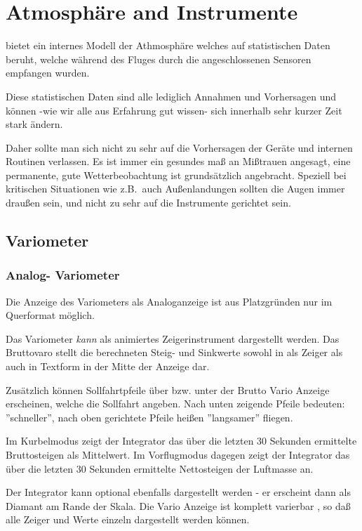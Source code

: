\chapter{Atmosphäre and Instrumente}\label{cha:atmosph}
\xc bietet ein internes Modell der Athmosphäre welches auf statistischen Daten beruht,
welche während des Fluges durch die angeschlossenen Sensoren empfangen wurden.

Diese statistischen Daten sind alle lediglich Annahmen und Vorhersagen und können -wie wir alle
aus Erfahrung gut wissen-  sich innerhalb sehr kurzer Zeit stark ändern.

Daher sollte man sich nicht zu sehr auf die Vorhersagen der Geräte und internen Routinen verlassen.
Es ist immer ein gesundes maß an Mißtrauen angesagt, eine permanente, gute Wetterbeobachtung
ist grundsätzlich angebracht. Speziell bei kritischen Situationen wie z.B.\ auch
Außenlandungen sollten die Augen immer draußen sein, und nicht zu sehr auf die Instrumente
gerichtet sein.
\section{Variometer}
\subsection*{Analog- Variometer}
Die Anzeige des Variometers als Analoganzeige ist aus Platzgründen nur im Querformat möglich.

Das Variometer \textsl{kann} als animiertes Zeigerinstrument dargestellt werden.
Das Bruttovaro stellt die berechneten Steig- und Sinkwerte sowohl in als Zeiger als
auch in Textform in der Mitte der Anzeige dar.

Zusätzlich können Sollfahrtpfeile über bzw. unter der Brutto Vario Anzeige erscheinen,
welche die Sollfahrt angeben. Nach unten zeigende Pfeile bedeuten: ''schneller'', nach oben
gerichtete Pfeile heißen ''langsamer'' fliegen.

Im Kurbelmodus zeigt der Integrator das über die letzten 30 Sekunden ermittelte Bruttosteigen als Mittelwert.
Im Vorflugmodus dagegen zeigt der Integrator das über die letzten 30 Sekunden ermittelte Nettosteigen der Luftmasse an.

Der Integrator kann optional ebenfalls dargestellt werden - er erscheint dann als Diamant am Rande der Skala.
Die Vario Anzeige ist komplett varierbar , so daß alle Zeiger und Werte einzeln dargestellt
werden können. 

